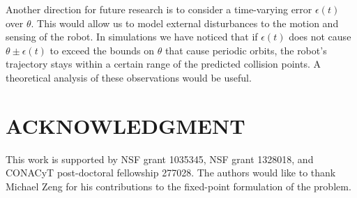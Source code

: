 \documentclass[letterpaper, 10 pt, conference]{ieeeconf}  %
\begin{document}
Another direction for future research is to consider a 
time-varying error $\epsilon(t)$ over $\theta$. This would
allow us to model external disturbances to the 
motion and sensing of the robot. In
simulations we have noticed that if $\epsilon(t)$ does not cause $\theta \pm
\epsilon(t)$ to exceed the bounds on $\theta$ that cause periodic orbits, the robot's 
trajectory stays within a certain range of the predicted collision points. 
A theoretical analysis of these observations would be useful. 

\addtolength{\textheight}{-12cm}   %








\section*{ACKNOWLEDGMENT}

This work is supported by NSF grant 1035345, NSF grant 1328018, and CONACyT
post-doctoral fellowship 277028. The authors would like to thank Michael Zeng
for his contributions to the fixed-point formulation of the problem.




\end{document}
